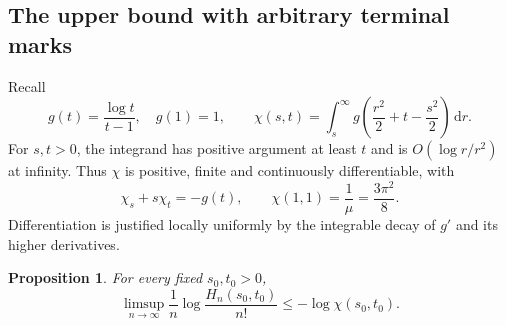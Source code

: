 \documentclass[11pt,letterpaper]{article}
\newtheorem{proposition}[theorem]{Proposition}
\theoremstyle{remark}
\newcommand{\egdd}{\,\mathrm d}
\newcommand{\muval}{\mu}
\begin{document}
\subsection{The upper bound with arbitrary terminal marks}
Recall
\begin{equation}\label{a58:eg:rat:chi}
 g(t)=\frac{\log t}{t-1},\quad g(1)=1,\qquad
 \chi(s,t)=\int_s^\infty g\left(\frac{r^2}{2}+t-\frac{s^2}{2}\right)\egdd r.
\end{equation}
For $s,t>0$, the integrand has positive argument at least $t$ and is $O(\log r/r^2)$ at infinity. Thus $\chi$ is positive, finite and continuously differentiable, with
\begin{equation}\label{a58:eg:rat:chiderivative}
 \chi_s+s\chi_t=-g(t),\qquad
 \chi(1,1)=\frac1{\muval}=\frac{3\pi^2}{8}.
\end{equation}
Differentiation is justified locally uniformly by the integrable decay of $g'$ and its higher derivatives.
\begin{proposition}\label{a58:eg:rat:weightedupper}
For every fixed $s_0,t_0>0$,
\begin{equation}\label{a58:eg:rat:weightedrate}
 \limsup_{n\to\infty}\frac1n\log\frac{H_n(s_0,t_0)}{n!}
 \le-\log\chi(s_0,t_0).
\end{equation}
\end{proposition}
\end{document}
